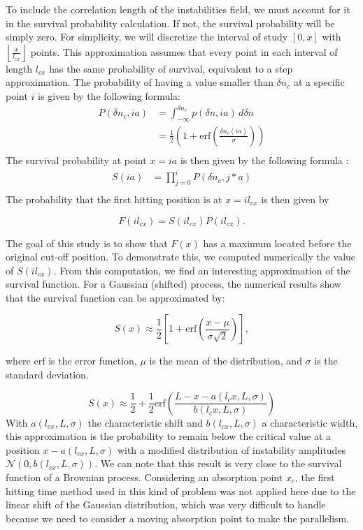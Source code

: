 \documentclass[11pt,openany]{report}
\begin{document}
\begin{multicols}{2}
    To include the correlation length of the instabilities field, we must account for it in the survival probability calculation. If not, the survival probability will be simply zero. For simplicity, we will discretize the interval of study $[0, x]$ with $\left\lfloor \frac{x}{l_{cx}} \right\rfloor$ points. This approximation assumes that every point in each interval of length $l_{cx}$ has the same probability of survival, equivalent to a step approximation. The probability of having a value smaller than $\delta n_c$ at a specific point $i$ is given by the following formula:
    \begin{align*}
        P(\delta n_c, ia) & = \int_{-\infty}^{\delta n_c} p(\delta n, ia) \, d\delta n                         \\
                          & = \frac{1}{2}\left(1 + \text{erf}\left(\frac{\delta n_c(ia)}{\sigma}\right)\right) \\
    \end{align*}
    The survival probability at point  $x = ia$ is then given by the following formula :
    \begin{align*}
        S(ia) & = \prod_{j=0}^{i} P(\delta n_c, j*a) \\
    \end{align*}
    The probability that the first hitting position is at \( x = il_{cx} \) is then given by

    \[ F(il_{cx}) = S(il_{cx})P(il_{cx}). \]

    The goal of this study is to show that \( F(x) \) has a maximum located before the original cut-off position. To demonstrate this, we computed numerically the value of \( S(il_{cx}) \). From this computation, we find an interesting approximation of the survival function. For a Gaussian (shifted) process, the numerical results show that the survival function can be approximated by:

    \[ S(x) \approx \frac{1}{2} \left[1 + \text{erf}\left(\frac{x - \mu}{\sigma \sqrt{2}}\right)\right], \]

    where \( \text{erf} \) is the error function, \( \mu \) is the mean of the distribution, and \( \sigma \) is the standard deviation.

    \begin{equation}\label{survival}
        S(x) \approx \frac{1}{2} + \frac{1}{2}\text{erf}\left(\frac{L - x- a(l_cx, L, \sigma)}{b(l_cx, L, \sigma)} \right)
    \end{equation}
    With \( a(l_{cx}, L, \sigma) \) the characteristic shift and \( b(l_{cx}, L, \sigma) \) a characteristic width, this approximation is the probability to remain below the critical value at a position \( x - a(l_{cx}, L, \sigma) \) with a modified distribution of instability amplitudes \( \mathcal{N}(0, b(l_{cx}, L, \sigma)) \). We can note that this result is very close to the survival function of a Brownian process. Considering an absorption point \( x_c \), the first hitting time method used in this kind of problem was not applied here due to the linear shift of the Gaussian distribution, which was very difficult to handle because we need to consider a moving absorption point to make the parallelism.


\end{multicols}
\end{document}
